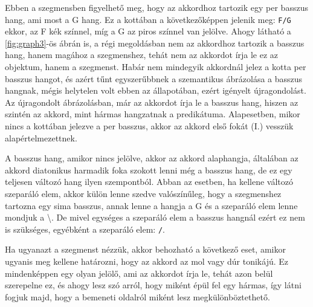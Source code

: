 Ebben a szegmensben figyelhető meg, hogy az akkordhoz tartozik egy per basszus hang, ami most a G hang. Ez a kottában a következőképpen jelenik meg: \texttt{F/G} ekkor, az F kék színnel, míg a G az piros színnel van jelölve. Ahogy látható a \ref{fig:graph3}-ös ábrán is, a régi megoldásban nem az akkordhoz tartozik a basszus hang, hanem magához a szegmenshez, tehát nem az akkordot írja le ez az objektum, hanem a szegmenst. Habár nem mindegyik akkordnál jelez a kotta per basszus hangot, és azért tűnt egyszerűbbnek a szemantikus ábrázolása a basszus hangnak, mégis helytelen volt ebben az állapotában, ezért igényelt újragondolást. Az újragondolt ábrázolásban, már az akkordot írja le a basszus hang, hiszen az szintén az akkord, mint hármas hangzatnak a predikátuma. Alapesetben, mikor nincs a kottában jelezve a per basszus, akkor az akkord első fokát (I.) vesszük alapértelmezettnek. \par
A basszus hang, amikor nincs jelölve, akkor az akkord alaphangja, általában az akkord diatonikus harmadik foka szokott lenni még a basszus hang, de ez egy teljesen változó hang ilyen szempontból. Abban az esetben, ha kellene változó szeparáló elem, akkor külön lenne szedve valószínűleg, hogy a szegmenshez tartozna egy sima basszus, annak lenne a hangja a G és a szeparáló elem lenne mondjuk a \textbackslash. De mivel egységes a szeparáló elem a basszus hangnál ezért ez nem is szükséges, egyébként a szeparáló elem: \texttt{/}.
\par
Ha ugyanazt a szegmenst nézzük, akkor behozható a következő eset, amikor ugyanis meg kellene határozni, hogy az akkord az mol vagy dúr tonikájú. Ez mindenképpen egy olyan jelölő, ami az akkordot írja le, tehát azon belül szerepelne ez, és ahogy lesz szó arról, hogy miként épül fel egy hármas, így látni fogjuk majd, hogy a bemeneti oldalról miként lesz megkülönböztethető.
\par
\newpage

